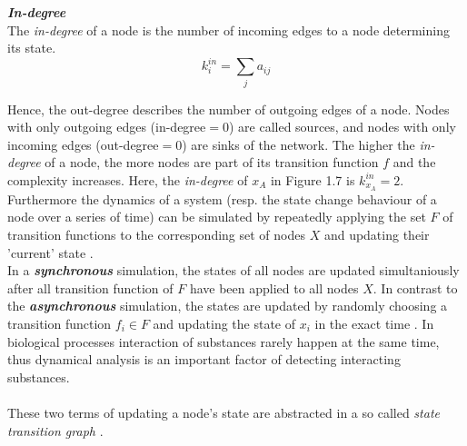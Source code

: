 \begin{defn}\textbf{\textit{In-degree}}\\
The \textit{in-degree} of a node is the number of incoming edges to a node determining its state.
\begin{equation}
k^{in}_{i}=\sum_{j}{a_{ij}}
\end{equation}
\end{defn}
\citep{Barman.2017, NykampDQ.hiddene}
Hence, the out-degree describes the number of outgoing edges of a node. Nodes with only outgoing edges (in-degree$=0$) are called sources, and nodes with only incoming edges (out-degree$=0$) are sinks of the network. The higher the \textit{in-degree} of a node, the more nodes are part of its transition function $f$ and the complexity increases. Here, the \textit{in-degree} of $x_{A}$ in Figure 1.7 is $k^{in}_{x_{A}}=2$.\\


Furthermore the dynamics of a system (resp. the state change behaviour of a node over a series of time) can be simulated by repeatedly applying the set $F$ of transition functions to the corresponding set of nodes $X$ and updating their 'current' state \citep{Berestovsky.2013}.\\
In a \textit{\textbf{synchronous}} simulation, the states of all nodes are updated simultaniously after all transition function of $F$ have been applied to all nodes $X$. In contrast to the \textit{\textbf{asynchronous}} simulation, the states are updated by randomly choosing a transition function $f_{i}\in F$ and updating the state of $x_{i}$ in the exact time \citep{Hopfensitz.2012, Liang.1998, Lahdesmaki.2003, Albert.2008}.
In biological processes interaction of substances rarely happen at the same time, thus dynamical analysis is an important factor of detecting interacting substances.
\\\\
These two terms of updating a node's state are abstracted in a so called \textit{state transition graph} \citep{Saadatpour.2013}.

